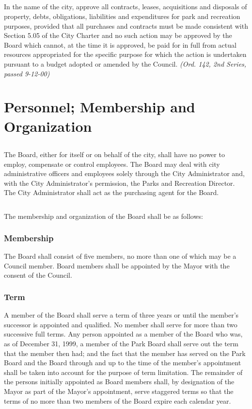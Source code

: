 \subsection{}
In the name of the city, approve all contracts, leases, acquisitions and disposals of property, debts, obligations, liabilities and expenditures for park and recreation purposes, provided that all purchases and contracts must be made consistent with Section 5.05 of the City Charter and no such action may be approved by the Board which cannot, at the time it is approved, be paid for in full from actual resources appropriated for the specific purpose for which the action is undertaken pursuant to a budget adopted or amended by the Council.\newline
\emph{(Ord. 142, 2nd Series, passed 9-12-00)}
\section{Personnel; Membership and Organization}
\subsection{}
The Board, either for itself or on behalf of the city, shall have no power to employ, compensate or control employees. The Board may deal with city administrative officers and employees solely through the City Administrator and, with the City Administrator’s permission, the Parks and Recreation Director. The City Administrator shall act as the purchasing agent for the Board.
\subsection{}
The membership and organization of the Board shall be as follows:
\subsubsection{Membership}
The Board shall consist of five members, no more than one of which may be a Council member. Board members shall be appointed by the Mayor with the consent of the Council.
\subsubsection{Term}
A member of the Board shall serve a term of three years or until the member’s successor is appointed and qualified. No member shall serve for more than two successive full terms.  Any person appointed as a member of the Board who was, as of December 31, 1999, a member of the Park Board shall serve out the term that the member then had; and the fact that the member has served on the Park Board and the Board through and up to the time of the member’s appointment shall be taken into account for the purpose of term limitation. The remainder of the persons initially appointed as Board members shall, by designation of the Mayor as part of the Mayor’s appointment, serve staggered terms so that the terms of no more than two members of the Board expire each calendar year.
